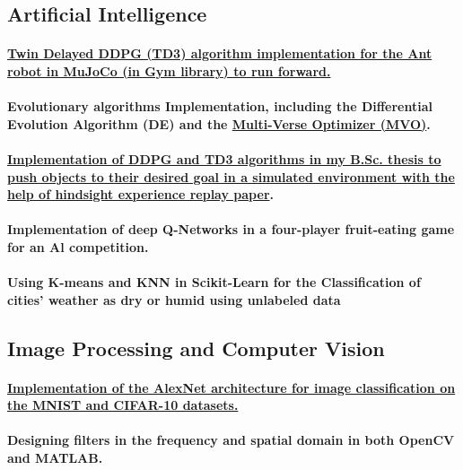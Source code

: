 \documentclass[a4paper]{article}
\begin{document}
\subsection{Artificial Intelligence}

\paragraph{\href{https://github.com/ake1999/TD3_Ant_v4}{Twin Delayed DDPG (TD3) algorithm implementation for the Ant robot in MuJoCo (in Gym library) to run forward.}}
\paragraph{Evolutionary algorithms Implementation, including the Differential Evolution Algorithm (DE) and the \href{https://github.com/ake1999/MVO_MATLAB}{Multi-Verse Optimizer (MVO)}.}
\paragraph{\href{https://github.com/ake1999/aarm}{Implementation of DDPG and TD3 algorithms in my B.Sc. thesis to push objects to their desired goal in a simulated environment with the help of hindsight experience replay paper}.}
\paragraph{Implementation of deep Q-Networks in a four-player fruit-eating game for an Al competition.}
\paragraph{Using K-means and KNN in Scikit-Learn for the Classification of cities' weather as dry or humid using unlabeled data}
            
\newpage
\subsection{Image Processing and Computer Vision}

\paragraph{\href{https://github.com/ake1999/CNN_AlexNet}{Implementation of the AlexNet architecture for image classification on the MNIST and CIFAR-10 datasets.}}
\paragraph{Designing filters in the frequency and spatial domain in both OpenCV and MATLAB.}
\end{document}
